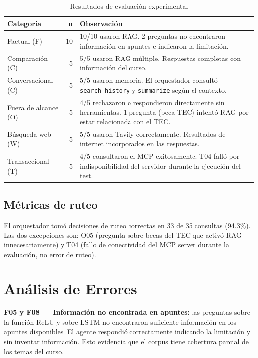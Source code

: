 \documentclass[conference]{IEEEtran}
\begin{document}
\begin{table}[htbp]
\caption{Resultados de evaluación experimental}
\label{tab:eval}
\begin{tabular}{@{}p{2.0cm}rp{4.0cm}@{}}
\toprule
\textbf{Categoría} & \textbf{n} & \textbf{Observación} \\
\midrule
Factual (F) & 10 & 10/10 usaron RAG. 2 preguntas no encontraron información en apuntes e indicaron la limitación. \\
\addlinespace
Comparación (C) & 5 & 5/5 usaron RAG múltiple. Respuestas completas con información del curso. \\
\addlinespace
Conversacional (C) & 5 & 5/5 usaron memoria. El orquestador consultó \texttt{search\_history} y \texttt{summarize} según el contexto. \\
\addlinespace
Fuera de alcance (O) & 5 & 4/5 rechazaron o respondieron directamente sin herramientas. 1 pregunta (beca TEC) intentó RAG por estar relacionada con el TEC. \\
\addlinespace
Búsqueda web (W) & 5 & 5/5 usaron Tavily correctamente. Resultados de internet incorporados en las respuestas. \\
\addlinespace
Transaccional (T) & 5 & 4/5 consultaron el MCP exitosamente. T04 falló por indisponibilidad del servidor durante la ejecución del test. \\
\bottomrule
\end{tabular}
\end{table}

\subsection{Métricas de ruteo}

El orquestador tomó decisiones de ruteo correctas en 33 de 35 consultas (94.3\%). Las dos excepciones son: O05 (pregunta sobre becas del TEC que activó RAG innecesariamente) y T04 (fallo de conectividad del MCP server durante la evaluación, no error de ruteo).

\section{Análisis de Errores}

\textbf{F05 y F08 — Información no encontrada en apuntes:} las preguntas sobre la función ReLU y sobre LSTM no encontraron suficiente información en los apuntes disponibles. El agente respondió correctamente indicando la limitación y sin inventar información. Esto evidencia que el corpus tiene cobertura parcial de los temas del curso.
\end{document}
